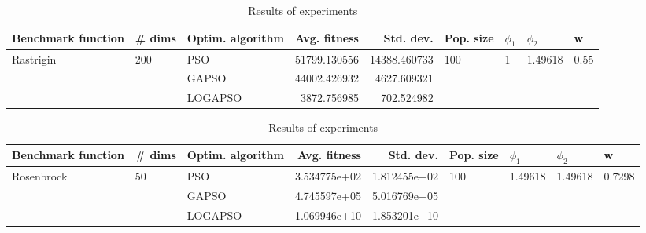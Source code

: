 \documentclass{article}
\begin{document}
\begin{table}
\centering
\caption{Results of experiments}
\begin{tabular}{lllrrllll}
\toprule
        Benchmark function &              \# dims & Optim. algorithm &  Avg. fitness &    Std. dev. &            Pop. size &         $\phi_{1}$ &               $\phi_{2}$ &                     w \\
\midrule
\multirow{3}{*}{Rastrigin} & \multirow{3}{*}{200} &              PSO &  51799.130556 & 14388.460733 & \multirow{3}{*}{100} & \multirow{3}{*}{1} & \multirow{3}{*}{1.49618} & \multirow{3}{*}{0.55} \\
                           &                      &            GAPSO &  44002.426932 &  4627.609321 &                      &                    &                          &                       \\
                           &                      &          LOGAPSO &   3872.756985 &   702.524982 &                      &                    &                          &                       \\
\bottomrule
\end{tabular}
\end{table}
\begin{table}
\centering
\caption{Results of experiments}
\begin{tabular}{lllrrllll}
\toprule
         Benchmark function &             \# dims & Optim. algorithm &  Avg. fitness &    Std. dev. &            Pop. size &               $\phi_{1}$ &               $\phi_{2}$ &                       w \\
\midrule
\multirow{3}{*}{Rosenbrock} & \multirow{3}{*}{50} &              PSO &  3.534775e+02 & 1.812455e+02 & \multirow{3}{*}{100} & \multirow{3}{*}{1.49618} & \multirow{3}{*}{1.49618} & \multirow{3}{*}{0.7298} \\
                            &                     &            GAPSO &  4.745597e+05 & 5.016769e+05 &                      &                          &                          &                         \\
                            &                     &          LOGAPSO &  1.069946e+10 & 1.853201e+10 &                      &                          &                          &                         \\
\bottomrule
\end{tabular}
\end{table}
\end{document}
